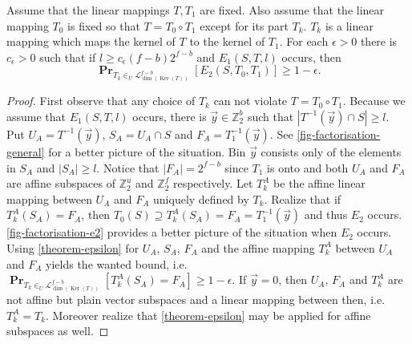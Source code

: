 \documentclass[unicode,review]{siamart1116}
\newcommand{\vecspace}[2]{\mathbb{Z}_{#1}^{#2}}
\newcommand{\binvecspace}[1]{\vecspace{2}{#1}}
\newcommand{\linearmaps}[2]{\mathcal{L}_{#1}^{#2}}
\newcommand{\probs}[2]{\operatorname{\mathbf{Pr}}_{{#1}}\left[{#2}\right]}
\numberwithin{theorem}{section}
\begin{document}
\begin{lemma}
\label{lemma-e1-e2}
Assume that the linear mappings $T, T_1$ are fixed.
Also assume that the linear mapping $T_0$ is fixed so that $T = T_0 \circ T_1$ except for its part $T_k$. $T_k$ is a linear mapping which maps the kernel of $T$ to the kernel of $T_1$.
For each $\epsilon > 0$ there is $c_\epsilon > 0$ such that if $l \geq c_\epsilon (f - b)2^{f-b}$ and $E_1(S, T, l)$ occurs, then
\[
\probs{T_k \in_U \linearmaps{\operatorname{dim}(\operatorname{Ker}(T))}{f-b}}{E_2(S, T_0, T_1)} \geq 1 - \epsilon.
\]
\end{lemma}
\begin{proof}
First observe that any choice of $T_k$ can not violate $T = T_0 \circ T_1$.
Because we assume that $E_1(S, T, l)$ occurs, there is $\vec{y} \in \binvecspace{b}$ such that $|T^{-1}(\vec{y}) \cap S| \geq l$.
Put $U_A = T^{-1}(\vec{y})$, $S_A = U_A \cap S$ and $F_A = T_1^{-1}(\vec{y})$.
See \cref{fig-factorisation-general} for a better picture of the situation.
Bin $\vec{y}$ consists only of the elements in $S_A$ and $|S_A| \geq l$.
Notice that $|F_A| = 2^{f-b}$ since $T_1$ is onto and both $U_A$ and $F_A$ are affine subspaces of $\binvecspace{u}$ and $\binvecspace{f}$ respectively. 
Let $T_k^A$ be the affine linear mapping between $U_A$ and $F_A$ uniquely defined by $T_k$.
Realize that if $T_k^A(S_A) = F_A$, then $T_0(S) \supseteq T_k^A(S_A) = F_A = T_1^{-1}(\vec{y})$ and thus $E_2$ occurs.
\cref{fig-factorisation-e2} provides a better picture of the situation when $E_2$ occurs.
Using \cref{theorem-epsilon} for $U_A$, $S_A$, $F_A$ and the affine mapping $T_k^A$ between $U_A$ and $F_A$ yields the wanted bound, i.e. $\probs{T_k \in_U \linearmaps{\operatorname{dim}(\operatorname{Ker}(T))}{f-b}}{T_k^A(S_A) = F_A} \geq 1 - \epsilon$. 
If $\vec{y} = 0$, then $U_A$, $F_A$ and $T_k^A$ are not affine but plain vector subspaces and a linear mapping between then, i.e. $T_k^A = T_k$.
Moreover realize that \cref{theorem-epsilon} may be applied for affine subspaces as well.
\end{proof}
\end{document}
